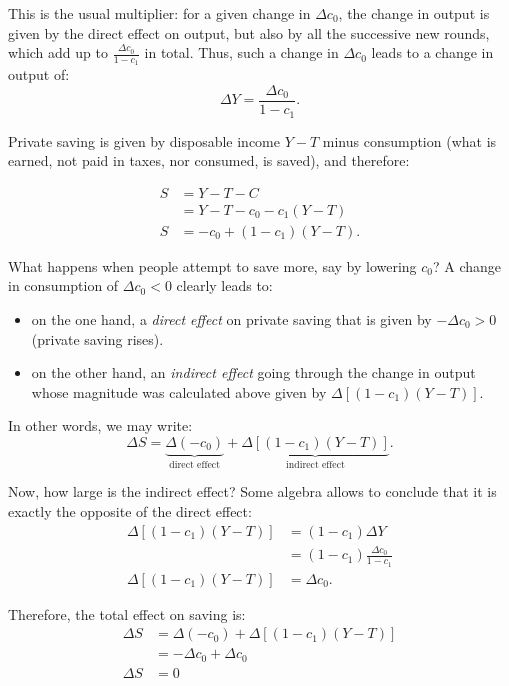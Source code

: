 \documentclass[]{book}
\theoremstyle{definition}
\theoremstyle{definition}
\theoremstyle{definition}
\theoremstyle{remark}
\begin{document}
This is the usual multiplier: for a given change in \(\Delta c_{0}\),
the change in output is given by the direct effect on output, but also
by all the successive new rounds, which add up to
\(\frac{\Delta c_{0}}{1-c_{1}}\) in total. Thus, such a change in
\(\Delta c_{0}\) leads to a change in output of:
\[\Delta Y=\frac{\Delta c_{0}}{1-c_{1}}.\]

Private saving is given by disposable income \(Y-T\) minus consumption
(what is earned, not paid in taxes, nor consumed, is saved), and
therefore:

\[
\begin{aligned}
S &= Y-T-C\\
&= Y-T-c_{0}-c_{1}\left(Y-T\right)\\
S   &= -c_{0}+\left(1-c_{1}\right)\left(Y-T\right).
\end{aligned}
\]

What happens when people attempt to save more, say by lowering
\(c_{0}\)? A change in consumption of \(\Delta c_{0}<0\) clearly leads
to:

\begin{itemize}
\item
  on the one hand, a \emph{direct effect} on private saving that is
  given by \(-\Delta c_{0}>0\) (private saving rises).
\item
  on the other hand, an \emph{indirect effect} going through the change
  in output whose magnitude was calculated above given by
  \(\Delta\left[\left(1-c_{1}\right)\left(Y-T\right)\right]\).
\end{itemize}

In other words, we may write:
\[\Delta S=\underbrace{\Delta(-c_{0})}_{\text{direct effect}}+\underbrace{\Delta\left[\left(1-c_{1}\right)\left(Y-T\right)\right]}_{\text{indirect effect}}.\]

Now, how large is the indirect effect? Some algebra allows to conclude
that it is exactly the opposite of the direct effect: \[\begin{aligned}
\Delta\left[\left(1-c_{1}\right)\left(Y-T\right)\right] &=(1-c_{1})\Delta Y\\
    &=(1-c_{1})\frac{\Delta c_{0}}{1-c_{1}}\\
\Delta\left[\left(1-c_{1}\right)\left(Y-T\right)\right] &=\Delta c_{0}.
\end{aligned}
\]

Therefore, the total effect on saving is: \[\begin{aligned}
\Delta S    &=\Delta(-c_{0})+\Delta\left[\left(1-c_{1}\right)\left(Y-T\right)\right]\\
    &=-\Delta c_{0}+\Delta c_{0}\\
\Delta S    &=0
\end{aligned}
\]
\end{document}
